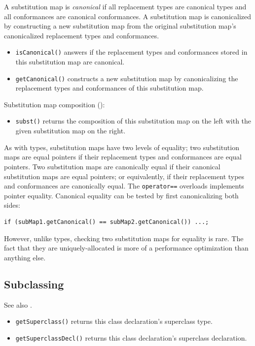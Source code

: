 \documentclass[../generics]{subfiles}
\begin{document}
A substitution map is \emph{canonical} if all replacement types are canonical types and all conformances are canonical conformances. A substitution map is canonicalized by constructing a new substitution map from the original substitution map's canonicalized replacement types and conformances.
\begin{itemize}
\item \texttt{isCanonical()} answers if the replacement types and conformances stored in this substitution map are canonical.
\item \texttt{getCanonical()} constructs a new substitution map by canonicalizing the replacement types and conformances of this substitution map.
\end{itemize}

Substitution map composition ():
\begin{itemize}
\item \texttt{subst()} returns the composition of this substitution map on the left with the given substitution map on the right.
\end{itemize}

As with types, substitution maps have two levels of equality; two substitution maps are equal pointers if their replacement types and conformances are equal pointers. Two substitution maps are canonically equal if their canonical substitution maps are equal pointers; or equivalently, if their replacement types and conformances are canonically equal. The \texttt{operator==} overloads implements pointer equality. Canonical equality can be tested by first canonicalizing both sides:
\begin{Verbatim}
if (subMap1.getCanonical() == subMap2.getCanonical()) ...;
\end{Verbatim}
However, unlike types, checking two substitution maps for equality is rare. The fact that they are uniquely-allocated is more of a performance optimization than anything else.

\subsection*{Subclassing}

See also .
\begin{itemize}
\item \texttt{getSuperclass()} returns this class declaration's superclass type.
\item \texttt{getSuperclassDecl()} returns this class declaration's superclass declaration.
\end{itemize}
\end{document}

